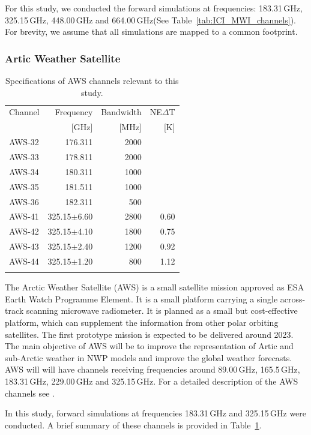 \documentclass[amt]{copernicus}
\begin{document}
For this study, we conducted the forward simulations at frequencies: 183.31\,GHz, 325.15\,GHz, 448.00\,GHz and 664.00\,GHz(See Table~\ref{tab:ICI_MWI_channels}). For brevity, we assume that all simulations are mapped to a common footprint.

\subsubsection{Artic Weather Satellite}
%
\begin{table}[t]
	\caption{Specifications of AWS channels relevant to this study.}
	\label{tab:specifications_AWS}	
	\begin{tabular}{lrrr}
		\tophline
		Channel & Frequency 	& Bandwidth & NE$\Delta$T \\
				& [GHz]			& [MHz]		& [K]		\\
		\middlehline
		AWS-32	&	176.311    & 2000	&		\\
		AWS-33	&	178.811    & 2000 	&	\\
		AWS-34	&	180.311    & 1000 	&	\\
		AWS-35	&	181.511    & 1000 	&	 \\
		AWS-36	&	182.311    & \phantom{0}500  &	 \\
		AWS-41  & 325.15$\pm$6.60    & 2800 	 &0.60\\
		AWS-42  & 325.15$\pm$4.10    & 1800    &0.75	\\
		AWS-43  & 325.15$\pm$2.40    & 1200    &0.92\\
		AWS-44  & 325.15$\pm$1.20    & \phantom{0}800  &1.12  \\
		\bottomhline
	\end{tabular}
	\belowtable{} %
\end{table}
The Arctic Weather Satellite (AWS) is a small satellite mission approved as ESA
Earth Watch Programme Element. It is a small platform carrying a single across-track scanning microwave radiometer. It is planned as a small but cost-effective platform, which can supplement the information from other polar orbiting satellites. The first prototype mission is expected to be delivered around 2023. The main objective of AWS will be to improve the representation of Artic and sub-Arctic weather in NWP models and improve the global weather forecasts. AWS will will have channels receiving frequencies around 89.00\,GHz, 165.5\,GHz, 183.31\,GHz, 229.00\,GHz and 325.15\,GHz. For a detailed description of the AWS channels see \citet{eriksson2020study}. 

In this study, forward simulations at frequencies 183.31\,GHz and 325.15\,GHz were conducted. A brief summary of these channels is provided in Table~\ref{tab:specifications_AWS}.
\end{document}
